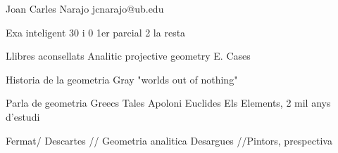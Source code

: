 Joan Carles Narajo
jcnarajo@ub.edu

Exa inteligent
30 i 0 1er parcial
2 la resta

Llibres aconsellats
Analitic projective geometry E. Cases

Historia de la geometria
Gray "worlds out of nothing"



Parla de geometria
Greecs
Tales Apoloni
Euclides	Els Elements, 2 mil anys d'estudi

Fermat/ Descartes // Geometria analitica
Desargues //Pintors, prespectiva
